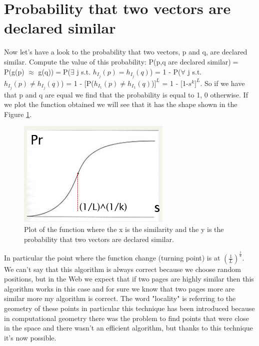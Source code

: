 \section{Probability that two vectors are declared similar}
Now let's have a look to the probability that two vectors, p and q, are declared similar.\newline
Compute the value of this probability:\newline
P(p,q are declared similar)$=$P(g(p) $\approx$ g(q))$=$P($\exists$ j s.t. $h_{I_j}(p)=h_{I_j}(q)$) = 1 - P($\forall$ j s.t. $h_{I_j}(p) \neq h_{I_j}(q)$) = 1 - [P($h_{I_1}(p) \neq h_{I_1}(q)$)$]^L$ = 1 - [1-$s^k]^L$.
So if we have that p and q are equal we find that the probability is equal to 1, 0 otherwise.\newline
If we plot the function obtained we will see that it has the shape shown in the Figure \ref{fig:lshfunction}.
\begin{figure}
    \centering
    \includegraphics[width=0.75\linewidth]{images/lshfunction.png}
    \caption{Plot of the function where the x is the similarity and the y is the probability that two vectors are declared similar.}
    \label{fig:lshfunction}
\end{figure}
In particular the point where the function change (turning point) is at $(\frac{1}{L})^{\frac{1}{k}}$.
We can't say that this algorithm is always correct because we choose random positions, but in the Web we expect that if two pages are highly similar then this algorithm works in this case and for sure we know that two pages more are similar more my algorithm is correct.\newline
The word "locality" is referring to the geometry of these points in particular this technique has been introduced because in computational geometry there was the problem to find points that were close in the space and there wasn't an efficient algorithm, but thanks to this technique it's now possible.
